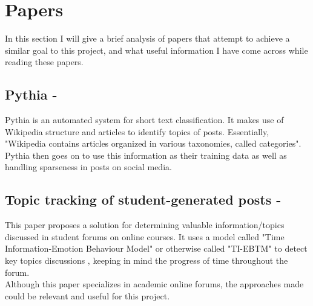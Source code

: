 \documentclass[a4paper,fleqn,10pt]{article}
\begin{document}
\section{Papers}
\label{sec:papers}

In this section I will give a brief analysis of papers that attempt to achieve a similar goal to this project, and what useful
information I have come across while reading these papers.

\subsection{Pythia - \cite{Pythia}}
Pythia is an automated system for short text classification. It makes use of Wikipedia structure and articles to identify
topics of posts.
Essentially, "Wikipedia contains articles organized in various taxonomies, called categories". Pythia then goes on to use
this information as their training data as well as handling sparseness in posts on social media.

\subsection{Topic tracking of student-generated posts - \cite{TopicTracking}}
This paper proposes a solution for determining valuable information/topics discussed in student forums on online courses.
It uses a model called "Time Information-Emotion Behaviour Model" or otherwise called "TI-EBTM" to detect key topics discussions
, keeping in mind the progress of time throughout the forum.\\
Although this paper specializes in academic online forums, the approaches made could be relevant and useful for this project.
\end{document}
